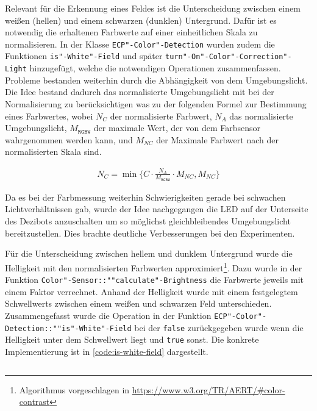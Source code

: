 Relevant für die Erkennung eines Feldes ist die Unterscheidung zwischen einem weißen (hellen) und einem schwarzen (dunklen) Untergrund. Dafür ist es notwendig die erhaltenen Farbwerte auf einer einheitlichen Skala zu normalisieren. In der Klasse \texttt{ECP"-Color"-Detection} wurden zudem die Funktionen \texttt{is"-White"-Field} und später \texttt{turn"-On"-Color"-Correction"-Light} hinzugefügt, welche die notwendigen Operationen zusammenfassen. Probleme bestanden weiterhin durch die Abhängigkeit von dem Umgebungslicht. Die Idee bestand dadurch das normalisierte Umgebungslicht mit bei der Normalisierung zu berücksichtigen was zu der folgenden Formel zur Bestimmung eines Farbwertes, wobei $N_{C}$ der normalisierte Farbwert, $N_{A}$ das normalisierte Umgebungslicht, $M_{\texttt{RGBW}}$ der maximale Wert, der von dem Farbsensor wahrgenommen werden kann, und $M_{NC}$ der Maximale Farbwert nach der normalisierten Skala sind.

\begin{equation*}
    \begin{aligned}
        N_{C} = \min\Big\{C \cdot \frac{N_{A}}{M_{\texttt{RGBW}}} \cdot M_{NC}, M_{NC}\Big\}
    \end{aligned}
\end{equation*}

Da es bei der Farbmessung weiterhin Schwierigkeiten gerade bei schwachen Lichtverhältnissen gab, wurde der Idee nachgegangen die LED auf der Unterseite des Dezibots anzuschalten um so möglichst gleichbleibendes Umgebungslicht bereitzustellen. Dies brachte deutliche Verbesserungen bei den Experimenten.

Für die Unterscheidung zwischen hellem und dunklem Untergrund wurde die Helligkeit mit den normalisierten Farbwerten approximiert\footnote{Algorithmus vorgeschlagen in \url{https://www.w3.org/TR/AERT/\#color-contrast}}. Dazu wurde in der Funktion \texttt{Color"-Sensor::""calculate"-Brightness} die Farbwerte jeweils mit einem Faktor verrechnet. Anhand der Helligkeit wurde mit einem festgelegtem Schwellwerts zwischen einem weißen und schwarzen Feld unterschieden. Zusammengefasst wurde die Operation in der Funktion \texttt{ECP"-Color"-Detection::""is"-White"-Field} bei der \texttt{false} zurückgegeben wurde wenn die Helligkeit unter dem Schwellwert liegt und \texttt{true} sonst. Die konkrete Implementierung ist in \autoref{code:is-white-field} dargestellt.

\begin{listing}[h]
    \inputminted{cpp}{../assets/code/ECPColorDetection-isWhiteField.cpp}
    \caption{Code"=Ausschnitt zur \texttt{ECP"-Color"-Detection::""is"-White"-Field}"=Funktion}
    \label{code:is-white-field}
\end{listing}

